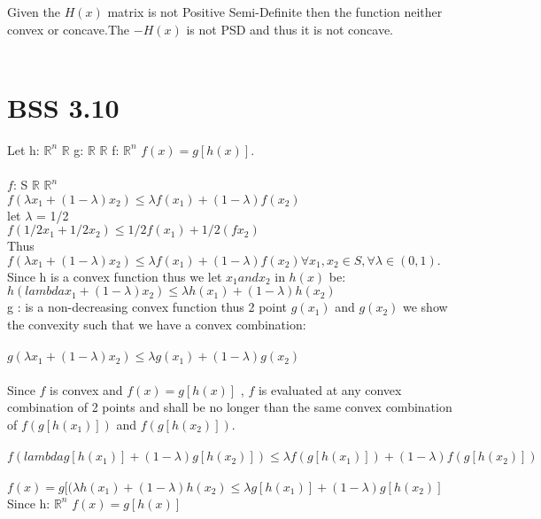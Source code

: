 \documentclass[12pt]{article}
\newcommand{\R}{\mathbb{R}}
\begin{document}
Given the $H(x)$ matrix is not Positive Semi-Definite then the function neither convex or concave.The $-H(x)$ is not PSD and thus it is not concave. \\ \\
\section{BSS 3.10} 
Let h: $\R^n$ \longrightarrow $\R$  g: $\R$ \longrightarrow $\R$  f: $\R^n$ \longrightarrow \R {} $f(x) = g[h(x)]$. \\\\
 $f$: S \longrightarrow $\R$ \subseteq $\R^n$ \\
        $f(\lambda x_1 + (1-\lambda) x_2) \leq \lambda f(x_1) + (1-\lambda) f(x_2)$\\
        let $\lambda$ = 1/2 \\ 
        $f(1/2 x_1 + 1/2 x_2) \leq 1/2 f(x_1) + 1/2 (fx_2)$\\
        Thus\\
        $f(\lambda x_1 + (1-\lambda) x_2) \leq \lambda f(x_1) + (1-\lambda) f(x_2) \forall x_1, x_2 \in S, \forall \lambda \in (0,1). $ \\ 

Since h is a convex function thus we let $x_1 and x_2$ in $h(x)$ be:\\
$h(lambda x_1 + (1-\lambda) x_2) \leq \lambda h(x_1) + (1-\lambda) h(x_2)$\\ 
g : is a non-decreasing convex function thus 2 point $g(x_1)$ and $g(x_2)$ we show the convexity such that we have a convex combination:\\\\
$g(\lambda x_1 + (1-\lambda)x_2) \leq \lambda g(x_1) + (1-\lambda) g(x_2)$\\ \\
Since $f$ is convex and $f(x) = g[h(x)]$ , $f$ is evaluated at any convex combination of 2 points and shall be no longer than the same convex combination of $f(g[h(x_1)])$ and $f(g[h(x_2)])$. \\ \\ 
$f(lambda g[h(x_1)] + (1-\lambda) g[h(x_2)]) \leq \lambda f(g[h(x_1)]) + (1-\lambda) f(g[h(x_2)])$\\ 
\Leftrightarrow \\ 
$f(x) = g[(\lambda h(x_1) + (1-\lambda) h(x_2) \leq \lambda g[h(x_1)] + (1-\lambda) g[h(x_2)]$\\ 
Since h: $\R^n$ \longrightarrow \R {}$f(x) = g[h(x)]$ \\
\end{document}
